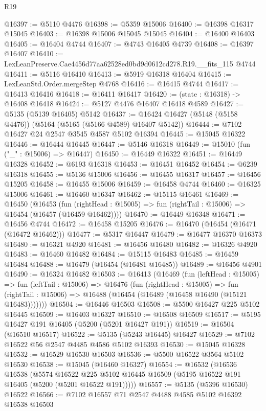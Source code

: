 \begin{lexlean}{R19}
\begin{coremodule}
{{{{{{{{{{{@16397 := @5110 @4476
@16398 := @5359 @15006
@16400 := @16398 @16317 @15045
@16403 := @16398 @15006 @15045 @15045
@16404 := @16400 @16403
@16405 := @16404 @4744
@16407 := @4743 @16405 @4739
@16408 := @16397 @16407
@16410 := LexLeanPreserve.Cae4456d77aa62528ed0bd9d0612cd278.R19.__fits_115 @4744
@16411 := @5116 @16410
@16413 := @5919 @16318 @16404
@16415 := LexLeanStd.Order.mergeStep @4768
@16416 := @16415 @4744
@16417 := @16413 @16416
@16418 := @16411 @16417
@16420 := (state : @16318) -> @16408 @16418
@16424 := @5127 @4476 @16407 @16418 @4589
@16427 := @5135 (@5139 @16405) @5142
@16437 := @16424 @16427 (@5148 (@5158 @4476)) (@5164 (@5165 (@5166 @4589) @16407 @5142))
@16444 := @7102 @16427 @24 @2547 @3545 @4587 @5102 @16394
@16445 := @15045 @16322
@16446 := @16444 @16445
@16447 := @5146 @16318
@16449 := @15010 (fun ("_" : @15006) => @16447)
@16450 := @16449 @16322
@16451 := @16449 @16328
@16452 := @6193 @16318
@16453 := @16451 @16452
@16454 := @6239 @16318
@16455 := @5136 @15006
@16456 := @16455 @16317
@16457 := @16456 @15205
@16458 := @16455 @15006
@16459 := @16458 @4744
@16460 := @16325 @15006
@16461 := @16460 @16347
@16462 := @15115 @16461
@16469 := @16450
    (@16453
      (fun (rightHead : @15005) => fun (rightTail : @15006) => @16454 (@16457 (@16459 @16462))))
@16470 := @16449 @16348
@16471 := @16456 @4744
@16472 := @16458 @15205
@16476 := @16470 (@16454 (@16471 (@16472 @16462)))
@16477 := @5317 @16447
@16479 := @16477 @16370 @16373
@16480 := @16321 @4920
@16481 := @16456 @16480
@16482 := @16326 @4920
@16483 := @16460 @16482
@16484 := @15115 @16483
@16485 := @16459 @16484
@16488 := @16479 (@16454 (@16481 @16485))
@16489 := @16456 @4901
@16490 := @16324 @16482
@16503 := @16413
    (@16469
      (fun (leftHead : @15005) =>
      fun (leftTail : @15006) =>
      @16476
        (fun (rightHead : @15005) =>
        fun (rightTail : @15006) => @16488 (@16454 (@16489 (@16458 @16490 (@15121 @16483)))))))
@16504 := @16446 @16503
@16508 := @5500 @16427 @225 @5102 @16445
@16509 := @16403 @16327
@16510 := @16508 @16509
@16517 := @5195 @16427 @191 @16405 (@5200 (@5201 @16427 @191))
@16519 := @16504 (@16510 @16517)
@16522 := @5135 (@5243 @16445) @16427
@16529 := @7102 @16522 @56 @2547 @4485 @4586 @5102 @16393
@16530 := @15045 @16328
@16532 := @16529 @16530 @16503
@16536 := @5500 @16522 @3564 @5102 @16530
@16538 := @15045 (@16460 @16327)
@16554 := @16532
    (@16536
      @16538
      (@5574
        @16522
        @225
        @5102
        @16445
        @16509
        (@5195 @16522 @191 @16405 (@5200 (@5201 @16522 @191)))))
@16557 := @5135 (@5396 @16530) @16522
@16566 := @7102 @16557 @71 @2547 @4488 @4585 @5102 @16392 @16538 @16503
}}}}}}}}}}}
\end{coremodule}
\end{lexlean}

